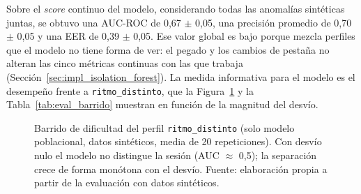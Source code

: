 Sobre el \textit{score} continuo del modelo, considerando todas las anomalías sintéticas juntas, se obtuvo una AUC-ROC de 0,67 $\pm$ 0,05, una precisión promedio de 0,70 $\pm$ 0,05 y una EER de 0,39 $\pm$ 0,05. Ese valor global es bajo porque mezcla perfiles que el modelo no tiene forma de ver: el pegado y los cambios de pestaña no alteran las cinco métricas continuas con las que trabaja (Sección~\ref{sec:impl_isolation_forest}). La medida informativa para el modelo es el desempeño frente a \texttt{ritmo\_distinto}, que la Figura~\ref{fig:eval_barrido} y la Tabla~\ref{tab:eval_barrido} muestran en función de la magnitud del desvío.

\begin{figure}[h!]
    \centering
    \caption[Barrido de dificultad del perfil \texttt{ritmo\_distinto}]{Barrido de dificultad del perfil \texttt{ritmo\_distinto} (solo modelo poblacional, datos sintéticos, media de 20 repeticiones). Con desvío nulo el modelo no distingue la sesión (AUC $\approx$ 0,5); la separación crece de forma monótona con el desvío. Fuente: elaboración propia a partir de la evaluación con datos sintéticos.}
    \label{fig:eval_barrido}
\end{figure}

